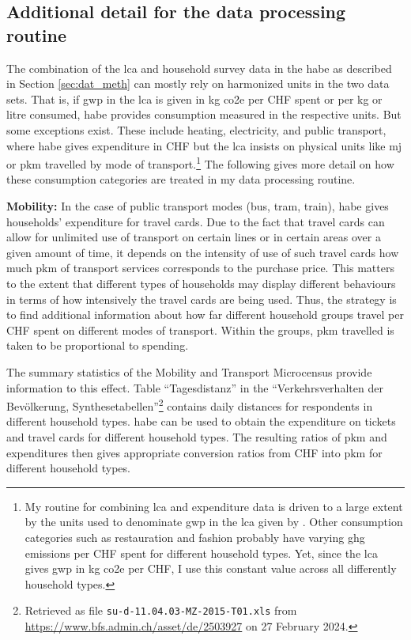 \documentclass[referee, lineno, pdflatex,sn-apa]{sn-jnl}%
\theoremstyle{thmstyleone}%
\theoremstyle{thmstyletwo}%
\theoremstyle{thmstylethree}%
\begin{document}
\begin{appendices}

\section{Additional detail for the data processing routine}
\label{app:hhdata}

The combination of the \ac{lca} and household survey data in the \ac{habe} as described in Section \ref{sec:dat_meth} can mostly rely on harmonized units in the two data sets.
That is, if \ac{gwp} in the \ac{lca} is given in kg \ac{co2e} per CHF spent or per kg or litre consumed, \ac{habe} provides consumption measured in the respective units.
But some exceptions exist.
These include heating, electricity, and public transport, where \ac{habe} gives expenditure in CHF but the \ac{lca} insists on physical units like \ac{mj} or \ac{pkm} travelled by mode of transport.\footnote{%
  My routine for combining \ac{lca} and expenditure data is driven to a large extent by the units used to denominate \ac{gwp} in the \ac{lca} given by \citet{jakobs_nfp73_2023}.
  Other consumption categories such as restauration and fashion probably have varying \ac{ghg} emissions per CHF spent for different household types.
  Yet, since the \ac{lca} gives \ac{gwp} in kg \ac{co2e} per CHF, I use this constant value across all differently household types.
}
The following gives more detail on how these consumption categories are treated in my data processing routine.

{\bfseries Mobility:}
In the case of public transport modes (bus, tram, train), \ac{habe} gives households' expenditure for travel cards.
Due to the fact that travel cards can allow for unlimited use of transport on certain lines or in certain areas over a given amount of time, it depends on the intensity of use of such travel cards how much \ac{pkm} of transport services corresponds to the purchase price.
This matters to the extent that different types of households may display different behaviours in terms of how intensively the travel cards are being used.
Thus, the strategy is to find additional information about how far different household groups travel per CHF spent on different modes of transport.
Within the groups, \ac{pkm} travelled is taken to be proportional to spending.

The summary statistics of the Mobility and Transport Microcensus  \citep{biedermann_verkehrsverhalten_2017} provide information to this effect.
Table ``Tagesdistanz'' in the ``Ver\-kehrs\-ver\-hal\-ten der Be\-völ\-ke\-rung, Synthesetabellen''\footnote{Retrieved as file \texttt{su-d-11.04.03-MZ-2015-T01.xls} from \url{https://www.bfs.admin.ch/asset/de/2503927} on 27 February 2024.} contains daily distances for respondents in different household types.
\ac{habe} can be used to obtain the expenditure on tickets and travel cards for different household types.
The resulting ratios of \ac{pkm} and expenditures then gives appropriate conversion ratios from CHF into \ac{pkm} for different household types.


\end{appendices}
\end{document}
